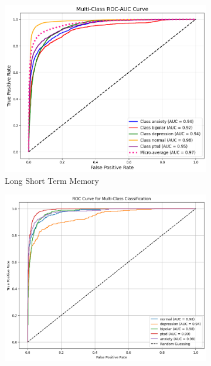 \pagebreak

\begin{figure}[H]
    \centering
    \begin{subfigure}[b]{0.49\textwidth}
        \centering
        \includegraphics[width=\textwidth]{Images/LSTM ROC.png}
        \caption{Long Short Term Memory}
        \label{LSTMROC}  %
    \end{subfigure}
    \hfill
    \begin{subfigure}[b]{0.49\textwidth}
        \centering
        \includegraphics[width=\textwidth]{Images/T ROC.png}

\end{subfigure}
\end{figure}
